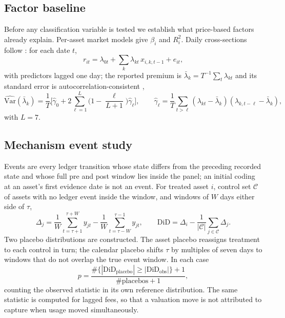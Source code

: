 \documentclass[10pt]{article}
\begin{document}
\subsection{Factor baseline}
Before any classification variable is tested we establish what price-based factors already explain. Per-asset market models give $\beta_i$ and $R^2_i$. Daily cross-sections follow \citet{famamacbeth1973}: for each date $t$,
\begin{equation}
r_{it} = \lambda_{0t} + \sum_{k}\lambda_{kt}\,x_{i,k,t-1} + e_{it},
\end{equation}
with predictors lagged one day; the reported premium is $\bar{\lambda}_k = T^{-1}\sum_t \lambda_{kt}$ and its standard error is autocorrelation-consistent \citep{neweywest1987},
\begin{equation}
\widehat{\mathrm{Var}}(\bar{\lambda}_k) = \frac{1}{T}\Big[\hat{\gamma}_0 + 2\sum_{\ell=1}^{L}\Big(1-\frac{\ell}{L+1}\Big)\hat{\gamma}_\ell\Big],
\qquad \hat{\gamma}_\ell = \frac{1}{T}\sum_{t>\ell}(\lambda_{kt}-\bar{\lambda}_k)(\lambda_{k,t-\ell}-\bar{\lambda}_k),
\end{equation}
with $L = 7$.

\subsection{Mechanism event study}
Events are every ledger transition whose state differs from the preceding recorded state and whose full pre and post window lies inside the panel; an initial coding at an asset's first evidence date is not an event. For treated asset $i$, control set $\mathcal{C}$ of assets with no ledger event inside the window, and windows of $W$ days either side of $\tau$,
\begin{equation}
\Delta_j = \frac{1}{W}\sum_{t=\tau+1}^{\tau+W} y_{jt} - \frac{1}{W}\sum_{t=\tau-W}^{\tau-1} y_{jt},
\qquad
\mathrm{DiD} = \Delta_i - \frac{1}{|\mathcal{C}|}\sum_{j \in \mathcal{C}}\Delta_j .
\end{equation}
Two placebo distributions are constructed. The asset placebo reassigns treatment to each control in turn; the calendar placebo shifts $\tau$ by multiples of seven days to windows that do not overlap the true event window. In each case
\begin{equation}
p = \frac{\#\{|\mathrm{DiD}_{\text{placebo}}| \ge |\mathrm{DiD}_{\text{obs}}|\} + 1}{\#\text{placebos} + 1},
\end{equation}
counting the observed statistic in its own reference distribution. The same statistic is computed for lagged fees, so that a valuation move is not attributed to capture when usage moved simultaneously.
\end{document}
